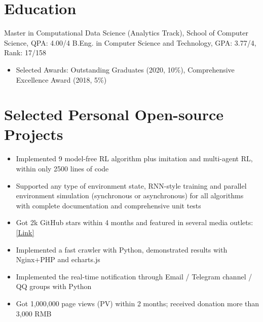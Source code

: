 \documentclass{resume}
\begin{document}



\section{Education}
Master in Computational Data Science (Analytics Track), School of Computer Science, QPA: 4.00/4
B.Eng. in Computer Science and Technology, GPA: 3.77/4, Rank: 17/158
\begin{itemize}
    \item Selected Awards: Outstanding Graduates (2020, 10\%), Comprehensive Excellence Award (2018, 5\%)
\end{itemize}

\section{Selected Personal Open-source Projects}
\begin{itemize}
  \item Implemented 9 model-free RL algorithm plus imitation and multi-agent RL, within only 2500 lines of code
  \item Supported any type of environment state, RNN-style training and parallel environment simulation (synchronous or asynchronous) for all algorithms with complete documentation and comprehensive unit tests
  \item Got 2k GitHub stars within 4 months and featured in several media outlets: \href{https://www.jiqizhixin.com/articles/2020-03-31-7}{[Link]}
\end{itemize}

\begin{itemize}
  \item Implemented a fast crawler with Python, demonstrated results with Nginx+PHP and echarts.js
  \item Implemented the real-time notification through Email / Telegram channel / QQ groups with Python
  \item Got 1,000,000 page views (PV) within 2 months; received donation more than 3,000 RMB
\end{itemize}
\end{document}
